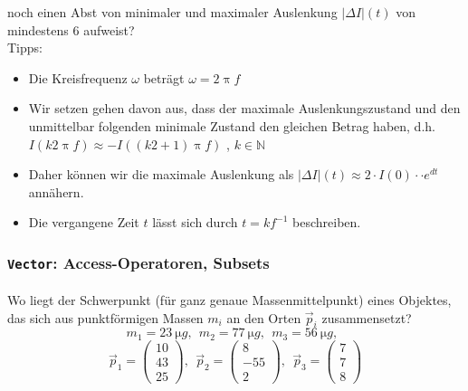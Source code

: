 \documentclass[paper=A4, pagesize, DIV=calc, smallheadings,
fontsize=12pt, expansion=false]{scrreprt}
\begin{document}
noch einen Abst von minimaler und maximaler Auslenkung $|\Delta I|(t)$ von mindestens \SI{6}{} aufweist?\\
Tipps: 
\begin{itemize}
  \item Die Kreisfrequenz $\omega$ beträgt $\omega = 2 \uppi f$
  \item Wir setzen gehen davon aus, dass der maximale Auslenkungszustand und den unmittelbar folgenden minimale Zustand 
  den gleichen Betrag haben, d.h. $I(k2\uppi f) \approx -I\left( \left(k2 + 1 \right) \uppi f\right)$ , $k \in 
  \mathbb{N}$
  \item Daher können wir die maximale Auslenkung als $|\Delta I|(t) \approx 2 \cdot I(0) \cdot \cdot e^{dt} $ annähern.
  \item Die vergangene Zeit $t$ lässt sich durch $t = k f^{-1}$ beschreiben.
\end{itemize}



\subsubsection*{\texttt{\textbf{Vector}}: Access-Operatoren, Subsets}

\paragraph{}
Wo liegt der Schwerpunkt (für ganz genaue \glqq Massenmittelpunkt\grqq) eines Objektes, das sich aus punktförmigen 
Massen $m_i$ an 
den Orten $\vec{p}_i$ zusammensetzt?
\[
m_1 = \SI{23}{\micro g},~~ 
m_2 = \SI{77}{\micro g},~~
m_3 = \SI{56}{\micro g},~~
 \]
 \[
\vec{p}_1 = \begin{pmatrix}10 \\ 43 \\ 25\end{pmatrix},~~ 
\vec{p}_2 = \begin{pmatrix}8 \\ -55 \\ 2\end{pmatrix},~~ 
\vec{p}_3 = \begin{pmatrix}7 \\ 7 \\ 8\end{pmatrix}
\]
\end{document}

